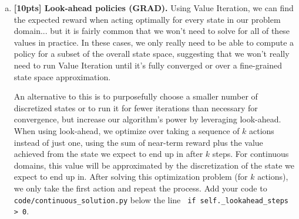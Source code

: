 \documentclass{article}
\begin{document}
\begin{enumerate}[(a)]
\begin{figure}[h!]
    \centering
    \begin{subfigure}{0.3\textwidth}
        \centering
        \texttt{[image: ../figures/MountainCar\_linear\_21.png]}
        \caption{Heatmap of state values after 150 iterations of the value iteration algorithm on the \texttt{MountainCar} environment using n-linear interpolation. The continuous state space has been discretized into 21x21 states.}
    \end{subfigure}
    \hspace{0.1 in}
    \begin{subfigure}{0.3\textwidth}
        \centering
        \texttt{[image: ../figures/MountainCar\_linear\_51.png]}
\caption{Heatmap of state values after 150 iterations of the value iteration algorithm on the \texttt{MountainCar} environment using n-linear interpolation. The continuous state space has been discretized into 51x51 states.}
    \end{subfigure}
        \hspace{0.1 in}
    \begin{subfigure}{0.3\textwidth}
        \centering
        \texttt{[image: ../figures/MountainCar\_linear\_151.png]}
\caption{Heatmap of state values after 150 iterations of the value iteration algorithm on the \texttt{MountainCar} environment using n-linear interpolation. The continuous state space has been discretized into 151x151 states.}
\end{subfigure}
\end{figure}



\item {\bf [10pts] Look-ahead policies \textbf{(GRAD)}.} Using Value Iteration, we can find the expected reward when acting optimally for every state in our problem domain... but it is fairly common that we won't need to solve for all of these values in practice. In these cases, we only really need to be able to compute a policy for a subset of the overall state space, suggesting that we won't really need to run Value Iteration until it's fully converged or over a fine-grained state space approximation.

An alternative to this is to purposefully choose a smaller number of discretized states or to run it for fewer iterations than necessary for convergence, but increase our algorithm's power by leveraging look-ahead. When using look-ahead, we optimize over taking a sequence of $k$ actions instead of just one, using the sum of near-term reward plus the value achieved from the state we expect to end up in after $k$ steps. For continuous domains, this value will be approximated by the discretization of the state we expect to end up in. After solving this optimization problem (for $k$ actions), we only take the first action and repeat the process. Add your code to \texttt{code/continuous\_solution.py} below the line \texttt{        if self.\_lookahead\_steps > 0}.


\end{enumerate}
\end{document}
